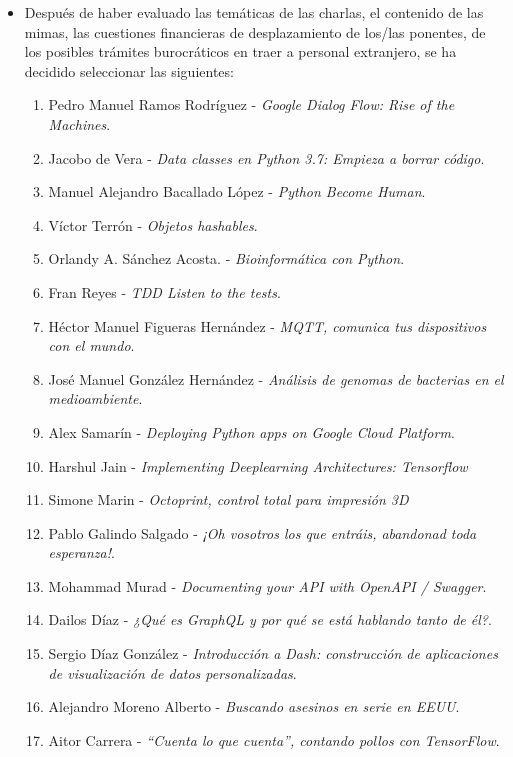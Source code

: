 \documentclass[a4paper, 12pt]{article}
\begin{document}
    \begin{itemize}
        \item Después de haber evaluado las temáticas de las charlas, el contenido de las mimas, las cuestiones financieras de desplazamiento de los/las ponentes, de los posibles trámites burocráticos en traer a personal extranjero, se ha decidido seleccionar las siguientes:
        \begin{enumerate}
            \item Pedro Manuel Ramos Rodríguez - \textit{Google Dialog Flow: Rise of the Machines}.
            \item Jacobo de Vera - \textit{Data classes en Python 3.7: Empieza a borrar código}.
            \item Manuel Alejandro Bacallado López - \textit{Python Become Human}.
            \item Víctor Terrón - \textit{Objetos hashables}.
            \item Orlandy A. Sánchez Acosta. - \textit{Bioinformática con Python}.
            \item Fran Reyes - \textit{TDD Listen to the tests}.
            \item Héctor Manuel Figueras Hernández - \textit{MQTT, comunica tus dispositivos con el mundo}.
            \item José Manuel González Hernández - \textit{Análisis de genomas de bacterias en el medioambiente}.
            \item Alex Samarín - \textit{Deploying Python apps on Google Cloud Platform}.
            \item Harshul Jain - \textit{Implementing Deeplearning Architectures: Tensorflow}
            \item Simone Marin - \textit{Octoprint, control total para impresión 3D}
            \item Pablo Galindo Salgado - \textit{¡Oh vosotros los que entráis, abandonad toda esperanza!}.
            \item Mohammad Murad - \textit{Documenting your API with OpenAPI / Swagger}.
            \item Dailos Díaz - \textit{¿Qué es GraphQL y por qué se está hablando tanto de él?}.
            \item Sergio Díaz González - \textit{Introducción a Dash: construcción de aplicaciones de visualización de datos personalizadas}.
            \item Alejandro Moreno Alberto - \textit{Buscando asesinos en serie en EEUU}.
            \item Aitor Carrera - \textit{``Cuenta lo que cuenta'', contando pollos con TensorFlow}.

\end{enumerate}
\end{itemize}
\end{document}
